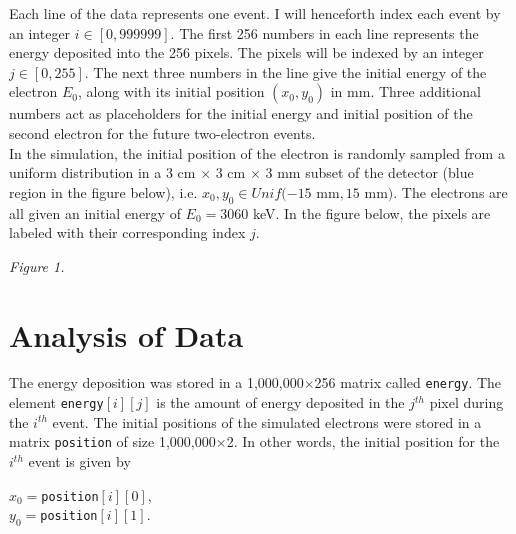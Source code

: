 \documentclass[12pt]{article}
\begin{document}
\noindent Each line of the data represents one event. I will henceforth index each event by an integer $i \in [0,999999]$. The first 256 numbers in each line represents the energy deposited into the 256 pixels. The pixels will be indexed by an integer $j \in [0,255]$. The next three numbers in the line give the initial energy of the electron $E_0$, along with its initial position $(x_0,y_0)$ in mm. Three additional numbers act as placeholders for the initial energy and initial position of the second electron for the future two-electron events.\\

\noindent In the simulation, the initial position of the electron is randomly sampled from a uniform distribution in a 3 cm $\times$ 3 cm $\times$ 3 mm subset of the detector (blue region in the figure below), i.e. $x_0,y_0 \in Unif(-15$ mm$,15$ mm$)$. The electrons are all given an initial energy of $E_0=3060$ keV. In the figure below, the pixels are labeled with their corresponding index $j$.

\begin{center}

\textit{Figure 1.} 
\end{center} 


\section{Analysis of Data}

The energy deposition was stored in a 1,000,000$\times$256 matrix called \texttt{energy}. The element \texttt{energy$[i][j]$} is the amount of energy deposited in the $j^{th}$ pixel during the $i^{th}$ event. The initial positions of the simulated electrons were stored in a matrix \texttt{position} of size 1,000,000$\times$2. In other words, the initial position for the $i^{th}$ event is given by
\begin{center}
$x_0=$\texttt{position$[i][0]$},\\
$y_0=$\texttt{position$[i][1]$}.
\end{center}
\end{document}
